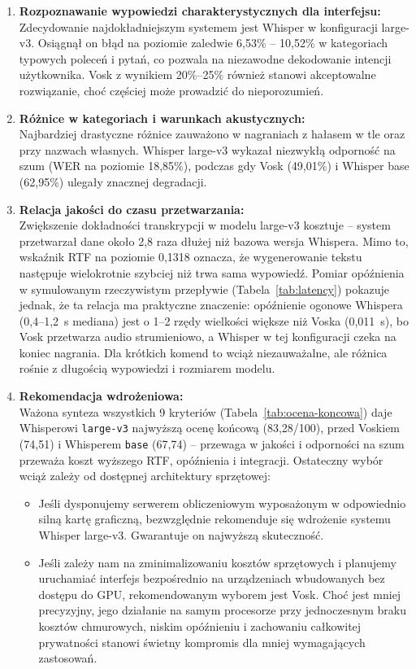 \documentclass{article}
\begin{document}
\begin{enumerate}
    \item \textbf{Rozpoznawanie wypowiedzi charakterystycznych dla interfejsu:} \\
    Zdecydowanie najdokładniejszym systemem jest Whisper w konfiguracji large-v3. Osiągnął on błąd na poziomie zaledwie 6,53\% -- 10,52\% w kategoriach typowych poleceń i pytań, co pozwala na niezawodne dekodowanie intencji użytkownika. Vosk z wynikiem 20\%--25\% również stanowi akceptowalne rozwiązanie, choć częściej może prowadzić do nieporozumień.
    
    \item \textbf{Różnice w kategoriach i warunkach akustycznych:} \\
    Najbardziej drastyczne różnice zauważono w nagraniach z hałasem w tle oraz przy nazwach własnych. Whisper large-v3 wykazał niezwykłą odporność na szum (WER na poziomie 18,85\%), podczas gdy Vosk (49,01\%) i Whisper base (62,95\%) ulegały znacznej degradacji.

    \item \textbf{Relacja jakości do czasu przetwarzania:} \\
    Zwiększenie dokładności transkrypcji w modelu large-v3 kosztuje -- system przetwarzał dane około 2,8 raza dłużej niż bazowa wersja Whispera. Mimo to, wskaźnik RTF na poziomie 0,1318 oznacza, że wygenerowanie tekstu następuje wielokrotnie szybciej niż trwa sama wypowiedź. Pomiar opóźnienia w symulowanym rzeczywistym przepływie (Tabela~\ref{tab:latency}) pokazuje jednak, że ta relacja ma praktyczne znaczenie: opóźnienie ogonowe Whispera (0,4--1,2~s mediana) jest o 1--2 rzędy wielkości większe niż Voska (0,011~s), bo Vosk przetwarza audio strumieniowo, a Whisper w tej konfiguracji czeka na koniec nagrania. Dla krótkich komend to wciąż niezauważalne, ale różnica rośnie z długością wypowiedzi i rozmiarem modelu.

    \item \textbf{Rekomendacja wdrożeniowa:} \\
    Ważona synteza wszystkich 9 kryteriów (Tabela~\ref{tab:ocena-koncowa}) daje Whisperowi \texttt{large-v3} najwyższą ocenę końcową (83,28/100), przed Voskiem (74,51) i Whisperem \texttt{base} (67,74) -- przewaga w jakości i odporności na szum przeważa koszt wyższego RTF, opóźnienia i integracji. Ostateczny wybór wciąż zależy od dostępnej architektury sprzętowej:
    \begin{itemize}
        \item Jeśli dysponujemy serwerem obliczeniowym wyposażonym w odpowiednio silną kartę graficzną, bezwzględnie rekomenduje się wdrożenie systemu Whisper large-v3. Gwarantuje on najwyższą skuteczność.
        \item Jeśli zależy nam na zminimalizowaniu kosztów sprzętowych i planujemy uruchamiać interfejs bezpośrednio na urządzeniach wbudowanych bez dostępu do GPU, rekomendowanym wyborem jest Vosk. Choć jest mniej precyzyjny, jego działanie na samym procesorze przy jednoczesnym braku kosztów chmurowych, niskim opóźnieniu i zachowaniu całkowitej prywatności stanowi świetny kompromis dla mniej wymagających zastosowań.
    \end{itemize}
\end{enumerate}
\end{document}
